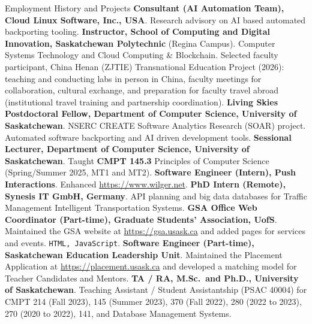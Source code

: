 \begin{rubric}{Employment History and Projects}
\entry*[2025/26]%
	\textbf{Consultant (AI Automation Team), Cloud Linux Software, Inc., USA}.
	Research advisory on AI based automated backporting tooling.
\vspace{-1mm}
\entry*[2024/Pres.]%
	\textbf{Instructor, School of Computing and Digital Innovation, Saskatchewan Polytechnic} (Regina Campus).
	Computer Systems Technology and Cloud Computing \& Blockchain. Selected faculty participant, China Henan (ZJTIE) Transnational Education Project (2026): teaching and conducting labs in person in China, faculty meetings for collaboration, cultural exchange, and preparation for faculty travel abroad (institutional travel training and partnership coordination).
\vspace{-1mm}
\entry*[2024/Pres.]%
	\textbf{Living Skies Postdoctoral Fellow, Department of Computer Science, University of Saskatchewan}.
	NSERC CREATE Software Analytics Research (SOAR) project. Automated software backporting and AI driven development tools.
\vspace{-1mm}
\entry*[2025]%
	\textbf{Sessional Lecturer, Department of Computer Science, University of Saskatchewan}.
	Taught \textbf{CMPT 145.3} Principles of Computer Science (Spring/Summer 2025, MT1 and MT2).
\vspace{-1mm}
\entry*[2024]%
	\textbf{Software Engineer (Intern), Push Interactions}.
	Enhanced \url{https://www.wilger.net}.
\vspace{-1mm}
\entry*[2023]%
	\textbf{PhD Intern (Remote), Synesis IT GmbH, Germany}.
	API planning and big data databases for Traffic Management Intelligent Transportation Systems.
\vspace{-1mm}
\entry*[2022/24]%
	\textbf{GSA Office Web Coordinator (Part-time), Graduate Students' Association, UofS}.
	Maintained the GSA website at \url{https://gsa.usask.ca} and added pages for services and events. \texttt{HTML, JavaScript}.
\vspace{-1mm}
\entry*[2022/24]%
	\textbf{Software Engineer (Part-time), Saskatchewan Education Leadership Unit}.
	Maintained the Placement Application at \url{https://placement.usask.ca} and developed a matching model for Teacher Candidates and Mentors.
\vspace{-1mm}
\entry*[2017/24]%
	\textbf{TA / RA, M.Sc.\ and Ph.D., University of Saskatchewan}.
	Teaching Assistant / Student Assistantship (PSAC 40004) for CMPT 214 (Fall 2023), 145 (Summer 2023), 370 (Fall 2022), 280 (2022 to 2023), 270 (2020 to 2022), 141, and Database Management Systems.

\end{rubric}
